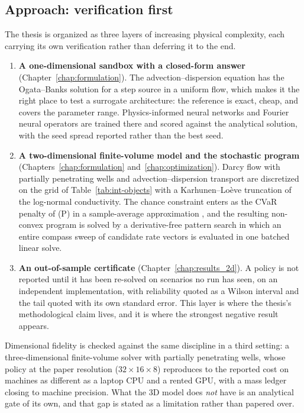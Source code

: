 \documentclass[11pt]{article}
\begin{document}
\subsection{Approach: verification first}

The thesis is organized as three layers of increasing physical complexity, each
carrying its own verification rather than deferring it to the end.

\begin{enumerate}
  \item \textbf{A one-dimensional sandbox with a closed-form answer}
        (Chapter~\ref{chap:formulation}). The advection--dispersion equation has the
        Ogata--Banks solution \citep{ogata1961solution} for a step source in a
        uniform flow, which makes it the right place to test a surrogate
        architecture: the reference is exact, cheap, and covers the parameter
        range. Physics-informed neural networks \citep{raissi2019pinn} and
        Fourier neural operators \citep{li2020fourier,li2021fno} are trained
        there and scored against the analytical solution, with the seed spread
        reported rather than the best seed.
  \item \textbf{A two-dimensional finite-volume model and the stochastic program}
        (Chapters~\ref{chap:formulation} and~\ref{chap:optimization}). Darcy flow
        with partially penetrating wells and advection--dispersion transport are
        discretized on the grid of Table~\ref{tab:int-objects} with a
        Karhunen--Lo\`eve truncation of the log-normal conductivity. The chance
        constraint enters as the CVaR penalty of (P) in a sample-average
        approximation \citep{rockafellar2000,shapiro2009}, and the resulting
        non-convex program is solved by a derivative-free pattern search in which
        an entire compass sweep of candidate rate vectors is evaluated in one
        batched linear solve.
  \item \textbf{An out-of-sample certificate} (Chapter~\ref{chap:results_2d}). A policy is
        not reported until it has been re-solved on scenarios no run has seen, on
        an independent implementation, with reliability quoted as a Wilson
        interval \citep{wilson1927probable} and the tail quoted with its own
        standard error. This layer is where the thesis's methodological claim
        lives, and it is where the strongest negative result appears.
\end{enumerate}

Dimensional fidelity is checked against the same discipline in a third setting: a
three-dimensional finite-volume solver with partially penetrating wells, whose
policy at the paper resolution ($32\times16\times8$) reproduces to the reported
cost on machines as different as a laptop CPU and a rented GPU, with a mass
ledger closing to machine precision. What the 3D model does \emph{not} have is an
analytical gate of its own, and that gap is stated as a limitation rather than
papered over.
\end{document}

